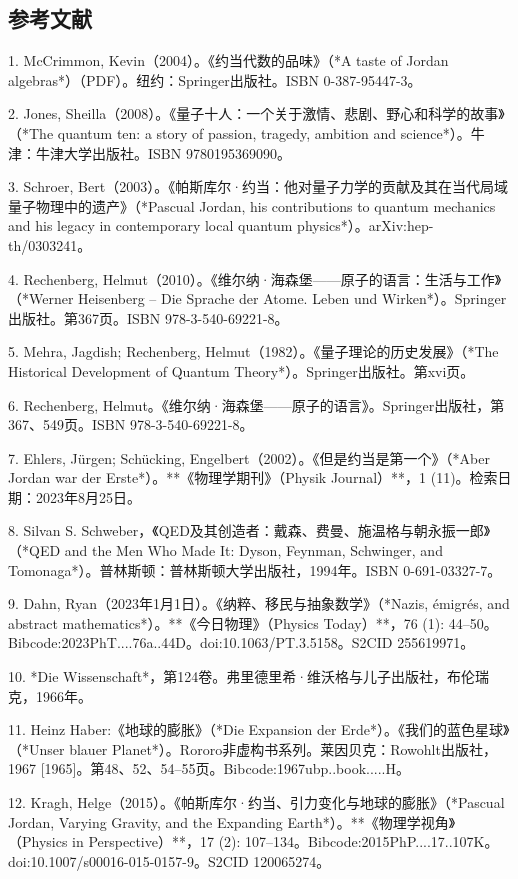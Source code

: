 \subsection{参考文献}

1. McCrimmon, Kevin（2004）。《约当代数的品味》（*A taste of Jordan algebras*）（PDF）。纽约：Springer出版社。ISBN 0-387-95447-3。

2. Jones, Sheilla（2008）。《量子十人：一个关于激情、悲剧、野心和科学的故事》（*The quantum ten: a story of passion, tragedy, ambition and science*）。牛津：牛津大学出版社。ISBN 9780195369090。

3. Schroer, Bert（2003）。《帕斯库尔·约当：他对量子力学的贡献及其在当代局域量子物理中的遗产》（*Pascual Jordan, his contributions to quantum mechanics and his legacy in contemporary local quantum physics*）。arXiv:hep-th/0303241。

4. Rechenberg, Helmut（2010）。《维尔纳·海森堡——原子的语言：生活与工作》（*Werner Heisenberg – Die Sprache der Atome. Leben und Wirken*）。Springer出版社。第367页。ISBN 978-3-540-69221-8。

5. Mehra, Jagdish; Rechenberg, Helmut（1982）。《量子理论的历史发展》（*The Historical Development of Quantum Theory*）。Springer出版社。第xvi页。

6. Rechenberg, Helmut。《维尔纳·海森堡——原子的语言》。Springer出版社，第367、549页。ISBN 978-3-540-69221-8。

7. Ehlers, Jürgen; Schücking, Engelbert（2002）。《但是约当是第一个》（*Aber Jordan war der Erste*）。**《物理学期刊》（Physik Journal）**，1 (11)。检索日期：2023年8月25日。

8. Silvan S. Schweber，《QED及其创造者：戴森、费曼、施温格与朝永振一郎》（*QED and the Men Who Made It: Dyson, Feynman, Schwinger, and Tomonaga*）。普林斯顿：普林斯顿大学出版社，1994年。ISBN 0-691-03327-7。

9. Dahn, Ryan（2023年1月1日）。《纳粹、移民与抽象数学》（*Nazis, émigrés, and abstract mathematics*）。**《今日物理》（Physics Today）**，76 (1): 44–50。Bibcode:2023PhT....76a..44D。doi:10.1063/PT.3.5158。S2CID 255619971。

10. *Die Wissenschaft*，第124卷。弗里德里希·维沃格与儿子出版社，布伦瑞克，1966年。

11. Heinz Haber:《地球的膨胀》（*Die Expansion der Erde*）。《我们的蓝色星球》（*Unser blauer Planet*）。Rororo非虚构书系列。莱因贝克：Rowohlt出版社，1967 [1965]。第48、52、54–55页。Bibcode:1967ubp..book.....H。

12. Kragh, Helge（2015）。《帕斯库尔·约当、引力变化与地球的膨胀》（*Pascual Jordan, Varying Gravity, and the Expanding Earth*）。**《物理学视角》（Physics in Perspective）**，17 (2): 107–134。Bibcode:2015PhP....17..107K。doi:10.1007/s00016-015-0157-9。S2CID 120065274。

